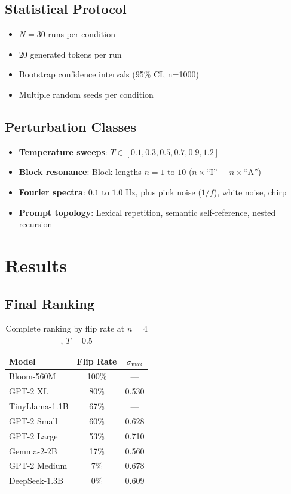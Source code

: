 \documentclass{article}
\begin{document}
\subsection{Statistical Protocol}

\begin{itemize}
    \item $N = 30$ runs per condition
    \item 20 generated tokens per run
    \item Bootstrap confidence intervals (95\% CI, n=1000)
    \item Multiple random seeds per condition
\end{itemize}

\subsection{Perturbation Classes}

\begin{itemize}
    \item \textbf{Temperature sweeps}: $T \in [0.1, 0.3, 0.5, 0.7, 0.9, 1.2]$
    \item \textbf{Block resonance}: Block lengths $n = 1$ to $10$ ($n\times$``I'' $+$ $n\times$``A'')
    \item \textbf{Fourier spectra}: $0.1$ to $1.0$ Hz, plus pink noise ($1/f$), white noise, chirp
    \item \textbf{Prompt topology}: Lexical repetition, semantic self-reference, nested recursion
\end{itemize}

\section{Results}

\subsection{Final Ranking}

\begin{table}[H]
\centering
\caption{Complete ranking by flip rate at $n=4$, $T=0.5$}
\label{tab:ranking}
\begin{tabular}{lcc}
\toprule
Model & Flip Rate & $\sigma_{\max}$ \\
\midrule
Bloom-560M & 100\% & — \\
GPT-2 XL & 80\% & 0.530 \\
TinyLlama-1.1B & 67\% & — \\
GPT-2 Small & 60\% & 0.628 \\
GPT-2 Large & 53\% & 0.710 \\
Gemma-2-2B & 17\% & 0.560 \\
GPT-2 Medium & 7\% & 0.678 \\
DeepSeek-1.3B & 0\% & 0.609 \\
\bottomrule
\end{tabular}
\end{table}
\end{document}
